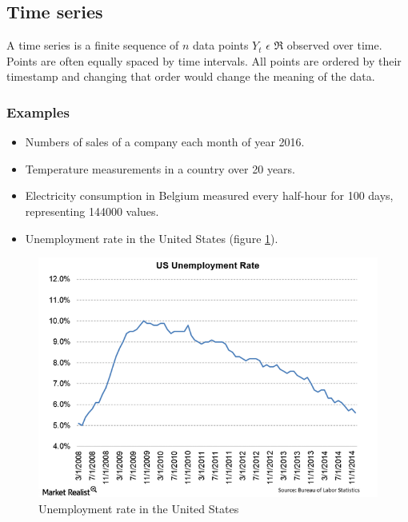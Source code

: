 \documentclass[11pt,a4paper,oneside]{book}
\newenvironment{myitemize}
{ \begin{itemize}
    \setlength\itemsep{0pt}}
{ \end{itemize}                  }
\begin{document}
\subsection{Time series}

A time series is a finite sequence of $n$ data points $Y_{t}$ $\epsilon$ $\Re$ observed over time. Points are often equally spaced by time intervals. All points are ordered by their timestamp and changing that order would change the meaning of the data. \cite{hyndman}

\subsubsection{Examples}

\begin{myitemize}
    \item Numbers of sales of a company each month of year 2016.
    \item Temperature measurements in a country over 20 years.
    \item Electricity consumption in Belgium measured every half-hour for 100 days, representing 144000 values.
    \item Unemployment rate in the United States (figure \ref{fig:US}).
\end{myitemize}

\begin{figure}[ht]
  \centering
    \includegraphics[scale=0.5]{img/Unemployment-Rate.png}
  \caption{Unemployment rate in the United States}
  \label{fig:US}
\end{figure}
\end{document}
